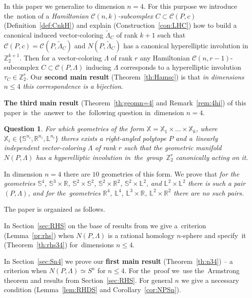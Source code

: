 \documentclass[12pt]{amsart}
\newtheorem{question}{Question}
\theoremstyle{definition}
\theoremstyle{remark}
\begin{document}
In this paper we generalize \cite[Theorem 11.5]{E24} to dimension $n=4$. For this
purpose we introduce the~notion of a {\it Hamiltonian $\mathcal{C}(n,k)$-subcomplex} $C\subset \mathcal{C}(P,c)$
(Definition~\ref{def:CnkH}) and explain (Construction~\ref{con:LHC}) how to build a canonical induced vector-coloring 
$\widetilde{\Lambda}_C$ of rank $k+1$ 
such that $\mathcal{C}(P,c)=\mathcal{C}(P,\widetilde{\Lambda}_C)$ and $N(P,\widetilde{\Lambda}_C)$
has a canonical hyperelliptic involution in $\mathbb Z_2^{k+1}$. Then for a vector-coloring $\Lambda$
of rank $r$ any Hamiltonian $\mathcal{C}(n,r-1)$-subcomplex $C\subset \mathcal{C}(P,\Lambda)$ inducing $\Lambda$
corresponds to a hyperelliptic involution $\tau_C\in \mathbb Z_2^r$. Our {\bf second main result}  
(Theorem~\ref{th:Hamsc}) is that {\it in dimensions $n\leqslant 4$ this correspondence is a bijection}.

{\bf The third main result} (Theorem~\ref{th:geomn=4} and Remark~\ref{rem:4hi}) of this paper
is~the~answer to~the~following question in~dimension $n=4$.
\begin{question}
For which geometries of the form $\mathbb X= \mathbb X_1\times\dots\times \mathbb X_k$, where $\mathbb X_i\in \{\mathbb S^{n_i},\mathbb R^{n_i},\mathbb L^{n_i}\}$ theres exists a right-angled polytope $P$ and a~linearly 
independent vector-coloring $\Lambda$ of rank $r$ such that the geometric manifold $N(P,\Lambda)$ has a hyperelliptic
involution in~the~group~$\mathbb Z_2^r$ canonically acting on it.
\end{question}
In dimension $n=4$ there are $10$ geometries of this form. We prove that {\it for
the geometries $\mathbb S^4$, $\mathbb S^3\times \mathbb R$, 
$\mathbb S^2\times \mathbb S^2$, $\mathbb S^2\times \mathbb R^2$, $\mathbb S^2\times \mathbb L^2$,
and $\mathbb L^2\times \mathbb L^2$ there is such a pair $(P,\Lambda)$, and for 
the~geometries $\mathbb R^4$, $\mathbb L^4$, $\mathbb L^3\times \mathbb R$, $\mathbb L^2\times\mathbb R^2$
there are no such pairs.  }

The paper is organized as follows.

In Section~\ref{sec:RHS} on the base of results from \cite{CP17,CP20} we give a~criterion
(Lemma~\ref{pr:rhs}) when $N(P,\Lambda)$ is a rational homology $n$-sphere and specify~it 
(Theorem~\ref{th:rhs34}) for~dimensions $n\leqslant 4$.

In Section~\ref{sec:Sn4} we prove our {\bf first main result} (Theorem~\ref{th:n34}) -- 
a criterion when $N(P,\Lambda)\simeq S^n$ for $n\leqslant 4$. For the~proof we~use
the~Armstrong theorem and results from Section~\ref{sec:RHS}. For general $n$
we give a necessary condition (Lemma~\ref{lem:RHDS} and Corollary~\ref{cor:NPSn}).
\end{document}
